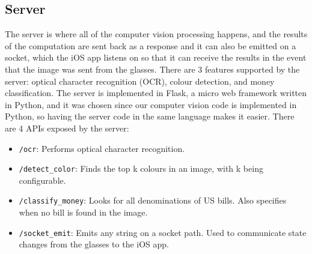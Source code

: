 \documentclass[a4paper,11pt]{article}
\begin{document}
\begin{center}
\end{center}

\subsection{Server}
\label{server}
The server is where all of the computer vision processing happens, and the results of the computation are sent back as a response and it can also be emitted on a socket, which the iOS app listens on so that it can receive the results in the event that the image was sent from the glasses. There are 3 features supported by the server: optical character recognition (OCR), colour detection, and money classification. The server is implemented in Flask, a micro web framework written in Python, and it was chosen since our computer vision code is implemented in Python, so having the server code in the same language makes it easier. There are 4 APIs exposed by the server:

\begin{itemize}
    \item \texttt{/ocr}: Performs optical character recognition.
    \item \texttt{/detect\_color}: Finds the top k colours in an image, with k being configurable.
    \item \texttt{/classify\_money}: Looks for all denominations of US bills. Also specifies when no bill is found in the image.
    \item \texttt{/socket\_emit}: Emits any string on a socket path. Used to communicate state changes from the glasses to the iOS app.
\end{itemize}
\end{document}
